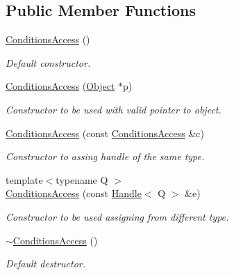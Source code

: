 \subsection*{Public Member Functions}
\begin{DoxyCompactItemize}
\item 
\hyperlink{class_d_d4hep_1_1_conditions_1_1_conditions_access_a837aa2f7c771e192a535024a1fc2f10a}{ConditionsAccess} ()
\begin{DoxyCompactList}\small\item\em Default constructor. \item\end{DoxyCompactList}\item 
\hyperlink{class_d_d4hep_1_1_conditions_1_1_conditions_access_a1f9e4b69121bbb7416bce5086bab7e9c}{ConditionsAccess} (\hyperlink{class_d_d4hep_1_1_conditions_1_1_conditions_manager_object}{Object} $\ast$p)
\begin{DoxyCompactList}\small\item\em Constructor to be used with valid pointer to object. \item\end{DoxyCompactList}\item 
\hyperlink{class_d_d4hep_1_1_conditions_1_1_conditions_access_a39e09b1816f8a9e0cfc63815356a44fb}{ConditionsAccess} (const \hyperlink{class_d_d4hep_1_1_conditions_1_1_conditions_access}{ConditionsAccess} \&c)
\begin{DoxyCompactList}\small\item\em Constructor to assing handle of the same type. \item\end{DoxyCompactList}\item 
{\footnotesize template$<$typename Q $>$ }\\\hyperlink{class_d_d4hep_1_1_conditions_1_1_conditions_access_a117b108aa0675602a50b8b9a4dd3292d}{ConditionsAccess} (const \hyperlink{class_d_d4hep_1_1_handle}{Handle}$<$ Q $>$ \&e)
\begin{DoxyCompactList}\small\item\em Constructor to be used assigning from different type. \item\end{DoxyCompactList}\item 
\hyperlink{class_d_d4hep_1_1_conditions_1_1_conditions_access_ab654b88bad13706fd78d4a92c1ba0eb4}{$\sim$ConditionsAccess} ()
\begin{DoxyCompactList}\small\item\em Default destructor. \item\end{DoxyCompactList}\item 

\end{DoxyCompactItemize}
